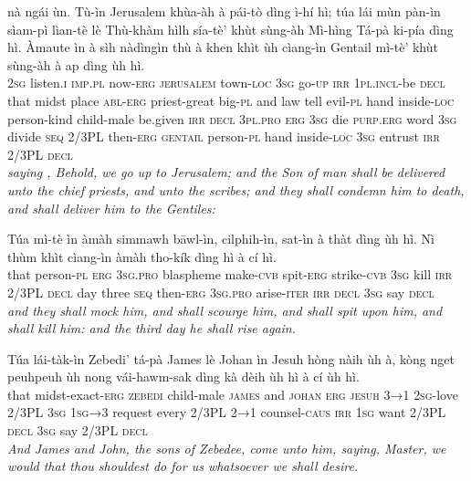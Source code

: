 \documentclass[11pt,a4paper]{article}
\begin{document}
\begin{exe}
\gll nà ngái ùn. Tù-ìn Jerusalem khùa-àh à pái-tò dìng ì-hí hì; túa lái mùn pàn-ìn sìam-pì lìan-tè lè Thù-khàm hìlh sía-tè' khùt sùng-àh Mì-hìng Tá-pà ki-pía dìng hì. Àmaute ìn à sìh nàdìngìn thù à khen khìt ùh cìang-ìn Gentail mì-tè' khùt sùng-àh à ap dìng ùh hì. \\
     \textsc{2sg} listen.\textsc{i} \textsc{imp}.\textsc{pl} now-\textsc{erg} \textsc{jerusalem} town-\textsc{loc} \textsc{3sg} go-\textsc{up} \textsc{irr} \textsc{1pl}.\textsc{incl}-be \textsc{decl} that midst place \textsc{abl}-\textsc{erg} priest-great big-\textsc{pl} and law tell evil-\textsc{pl} hand inside-\textsc{loc} person-kind child-male be.given \textsc{irr} \textsc{decl} \textsc{3pl}.\textsc{pro} \textsc{erg} \textsc{3sg} die \textsc{purp}.\textsc{erg} word \textsc{3sg} divide \textsc{seq} 2/3PL then-\textsc{erg} \textsc{gentail} person-\textsc{pl} hand inside-\textsc{loc} \textsc{3sg} entrust \textsc{irr} 2/3PL \textsc{decl} \\
\glt \textcolor{kjvcolor}{\textit{saying , Behold, we go up to Jerusalem; and the Son of man shall be delivered unto the chief priests, and unto the scribes; and they shall condemn him to death, and shall deliver him to the Gentiles:}}

\gll Túa mì-tè ìn àmàh simmawh bāwl-ìn, cilphih-ìn, sat-ìn à thàt dìng ùh hì. Nì thùm khìt cìang-ìn àmàh tho-kík dìng hì à cí hì. \\
     that person-\textsc{pl} \textsc{erg} \textsc{3sg}.\textsc{pro} blaspheme make-\textsc{cvb} spit-\textsc{erg} strike-\textsc{cvb} \textsc{3sg} kill \textsc{irr} 2/3PL \textsc{decl} day three \textsc{seq} then-\textsc{erg} \textsc{3sg}.\textsc{pro} arise-\textsc{iter} \textsc{irr} \textsc{decl} \textsc{3sg} say \textsc{decl} \\
\glt \textcolor{kjvcolor}{\textit{and they shall mock him, and shall scourge him, and shall spit upon him, and shall kill him: and the third day he shall rise again.}}

\gll Túa lái-tàk-ìn Zebedi' tá-pà James lè Johan ìn Jesuh hòng nàih ùh à, kòng nget peuhpeuh ùh nong vái-hawm-sak dìng kà dèih ùh hì à cí ùh hì. \\
     that midst-exact-\textsc{erg} \textsc{zebedi} child-male \textsc{james} and \textsc{johan} \textsc{erg} \textsc{jesuh} \textsc{3→1} \textsc{2sg}-love 2/3PL \textsc{3sg} \textsc{1sg→3} request every 2/3PL \textsc{2→1} counsel-\textsc{caus} \textsc{irr} \textsc{1sg} want 2/3PL \textsc{decl} \textsc{3sg} say 2/3PL \textsc{decl} \\
\glt \textcolor{kjvcolor}{\textit{And James and John, the sons of Zebedee, come unto him, saying, Master, we would that thou shouldest do for us whatsoever we shall desire.}}


\end{exe}
\end{document}
